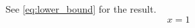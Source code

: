 \documentclass{article}
\begin{document}
See \eqref{eq:lower_bound} for the result.
\begin{equation}
\label{eq:lower_bound}
x = 1
\end{equation}
\end{document}
